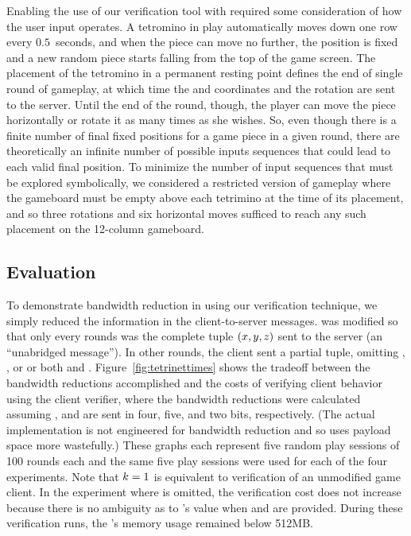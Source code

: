 Enabling the use of our verification tool with \tetrinet required some
consideration of how the user input operates. A tetromino in play
automatically moves down one row every $0.5$~seconds, and when the
piece can move no further, the position is fixed and a new random
piece starts falling from the top of the game screen. The placement of
the tetromino in a permanent resting point defines the end of single
round of gameplay, at which time the \tetrinetHorizontal and
\tetrinetVertical coordinates and the rotation \tetrinetOrientation
are sent to the server. Until the end of the round, though, the player
can move the piece horizontally or rotate it as many times as she
wishes. So, even though there is a finite number of final fixed
positions for a game piece in a given round, there are theoretically
an infinite number of possible inputs sequences that could lead to
each valid final position. To minimize the number of input sequences
that must be explored symbolically, we considered a restricted version
of gameplay where the gameboard must be empty above each tetrimino at
the time of its placement, and so three rotations and six horizontal
moves sufficed to reach any such placement on the 12-column gameboard.

\subsection{Evaluation}
To demonstrate bandwidth reduction in \tetrinet using our verification
technique, we simply reduced the information in the client-to-server
messages. \tetrinet was modified so that only every
\tetrinetUnabridgedFreq rounds was the complete tuple
$(x, y, z)$ sent
to the server (an ``unabridged message'').  In other rounds, the
client sent a partial tuple, omitting \tetrinetHorizontal,
\tetrinetVertical, or \tetrinetOrientation or both \tetrinetVertical
and \tetrinetOrientation.  Figure~\ref{fig:tetrinettimes} shows the
tradeoff between the bandwidth reductions accomplished and the costs
of verifying client behavior using the \lazy client verifier, where
the bandwidth reductions were calculated assuming \tetrinetHorizontal,
\tetrinetVertical and \tetrinetOrientation are sent in four, five, and
two bits, respectively.  (The actual \tetrinet implementation is not
engineered for bandwidth reduction and so uses payload space more
wastefully.)  These graphs each represent five random play sessions of
100 rounds each and the same five play sessions were used for each of
the four experiments.  Note that $k=1$ is
equivalent to verification of an unmodified game client. In the
experiment where \tetrinetVertical is omitted, the verification cost
does not increase because there is no ambiguity as to
\tetrinetVertical's value when \tetrinetHorizontal and
\tetrinetOrientation are provided. During these verification runs,
the \verifier's memory usage remained below 512MB.

